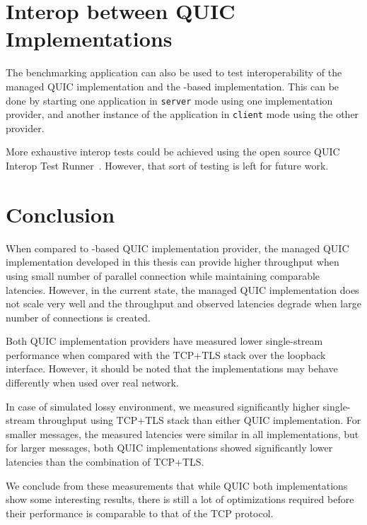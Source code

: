 \section{Interop between QUIC Implementations}

The benchmarking application can also be used to test interoperability of the managed QUIC
implementation and the \libmsquic{}-based implementation. This can be done by starting one
application in \texttt{server} mode using one implementation provider, and another instance of the
application in \texttt{client} mode using the other provider.

More exhaustive interop tests could be achieved using the open source QUIC Interop Test
Runner~\cite{QuicInteropRunner}. However, that sort of testing is left for future work.

\section{Conclusion}


When compared to \libmsquic{}-based QUIC implementation provider, the managed QUIC implementation
developed in this thesis can provide higher throughput when using small number of parallel
connection while maintaining comparable latencies. However, in the current state, the managed QUIC
implementation does not scale very well and the throughput and observed latencies degrade when large
number of connections is created.

Both QUIC implementation providers have measured lower single-stream performance when compared with
the TCP+TLS stack over the loopback interface. However, it should be noted that the implementations
may behave differently when used over real network.

In case of simulated lossy environment, we measured significantly higher single-stream throughput
using TCP+TLS stack than either QUIC implementation. For smaller messages, the measured latencies
were similar in all implementations, but for larger messages, both QUIC implementations showed
significantly lower latencies than the combination of TCP+TLS\@.

We conclude from these measurements that while QUIC both implementations show some interesting
results, there is still a lot of optimizations required before their performance is comparable to
that of the TCP protocol.
